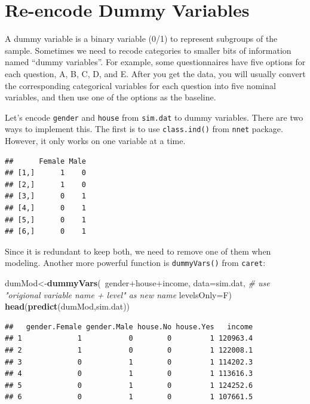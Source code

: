 \documentclass[]{book}
\newenvironment{Shaded}{\begin{snugshade}}{\end{snugshade}}
\newcommand{\KeywordTok}[1]{\textcolor[rgb]{0.13,0.29,0.53}{\textbf{{#1}}}}
\newcommand{\DataTypeTok}[1]{\textcolor[rgb]{0.13,0.29,0.53}{{#1}}}
\newcommand{\CommentTok}[1]{\textcolor[rgb]{0.56,0.35,0.01}{\textit{{#1}}}}
\newcommand{\NormalTok}[1]{{#1}}
\theoremstyle{definition}
\theoremstyle{definition}
\theoremstyle{remark}
\begin{document}
\section{Re-encode Dummy Variables}\label{re-encode-dummy-variables}

A dummy variable is a binary variable (0/1) to represent subgroups of
the sample. Sometimes we need to recode categories to smaller bits of
information named ``dummy variables''. For example, some questionnaires
have five options for each question, A, B, C, D, and E. After you get
the data, you will usually convert the corresponding categorical
variables for each question into five nominal variables, and then use
one of the options as the baseline.

Let's encode \texttt{gender} and \texttt{house} from \texttt{sim.dat} to
dummy variables. There are two ways to implement this. The first is to
use \texttt{class.ind()} from \texttt{nnet} package. However, it only
works on one variable at a time.

\begin{Shaded}
\end{Shaded}

\begin{verbatim}
##      Female Male
## [1,]      1    0
## [2,]      1    0
## [3,]      0    1
## [4,]      0    1
## [5,]      0    1
## [6,]      0    1
\end{verbatim}

Since it is redundant to keep both, we need to remove one of them when
modeling. Another more powerful function is \texttt{dummyVars()} from
\texttt{caret}:

\begin{Shaded}
\begin{Highlighting}[]
\NormalTok{dumMod<-}\KeywordTok{dummyVars}\NormalTok{(~gender+house+income,}
                  \DataTypeTok{data=}\NormalTok{sim.dat,}
                  \CommentTok{# use "origional variable name + level" as new name}
                  \DataTypeTok{levelsOnly=}\NormalTok{F)}
\KeywordTok{head}\NormalTok{(}\KeywordTok{predict}\NormalTok{(dumMod,sim.dat))}
\end{Highlighting}
\end{Shaded}

\begin{verbatim}
##   gender.Female gender.Male house.No house.Yes   income
## 1             1           0        0         1 120963.4
## 2             1           0        0         1 122008.1
## 3             0           1        0         1 114202.3
## 4             0           1        0         1 113616.3
## 5             0           1        0         1 124252.6
## 6             0           1        0         1 107661.5
\end{verbatim}
\end{document}
